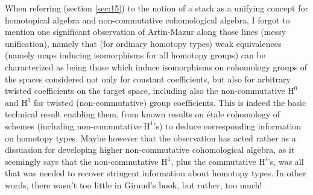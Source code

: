 \renewcommand{\thesection}{\arabic{section}} \label{sec:17}%
When referring (section \ref{sec:15}) to the notion of a stack as a unifying
concept for homotopical algebra and non-commutative cohomological
algebra, I forgot to mention one significant observation of
Artin-Mazur along those lines (messy unification), namely that (for
ordinary homotopy types) weak equivalences (namely maps inducing
isomorphisms for all homotopy groups) can be characterized as being
those which induce isomorphisms on cohomology groups of the spaces
considered not only for constant coefficients, but also for arbitrary
twisted coefficients on the target space, including also the
non-commutative $\mathrm H^0$ and $\mathrm H^1$ for twisted
(non-commutative) group coefficients. This is indeed the basic
technical result enabling them, from known results on \'etale
cohomology of schemes (including non-commutative $\mathrm H^1$'s) to
deduce corresponding information on homotopy types. Maybe however that
the observation has acted rather as a dissuasion for developing higher
non-commutative cohomological algebra, as it seemingly says that the
non-commutative $\mathrm H^1$, plus the commutative $\mathrm H^i$'s,
was all that was needed to recover stringent information about
homotopy types. In other words, there wasn't too little in Giraud's
book, but rather, too much!

\bigbreak

\presectionfill{}\par

